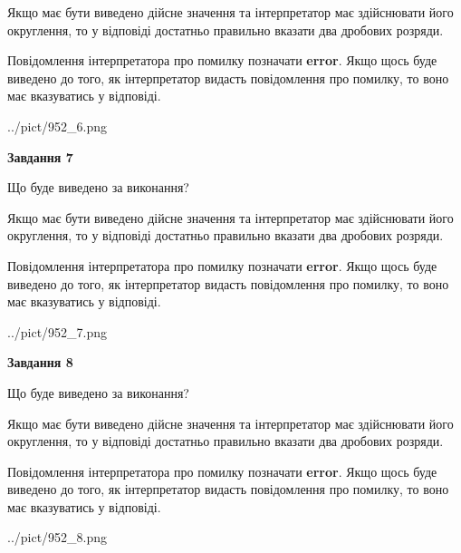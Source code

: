 \documentclass[12pt, ukrainian]{article}
\begin{document}
{\begin {Large}
Якщо має бути виведено дійсне значення та інтерпретатор має здійснювати його округлення, 
то у відповіді достатньо правильно вказати два дробових розряди.

Повідомлення інтерпретатора про помилку позначати \textbf{error}.
Якщо щось буде виведено до того, як інтерпретатор видасть повідомлення про помилку, 
то воно має вказуватись у відповіді. \par

\begin{center}
	{../pict/952_6.png}
\end{center}
\newpage

{\begin {center}\textbf{Завдання 7}\end {center}}\par
Що буде виведено за виконання? \par

Якщо має бути виведено дійсне значення та інтерпретатор має здійснювати його округлення, 
то у відповіді достатньо правильно вказати два дробових розряди.

Повідомлення інтерпретатора про помилку позначати \textbf{error}.
Якщо щось буде виведено до того, як інтерпретатор видасть повідомлення про помилку, 
то воно має вказуватись у відповіді. \par

\begin{center}
	{../pict/952_7.png}
\end{center}
\newpage

{\begin {center}\textbf{Завдання 8}\end {center}}\par
Що буде виведено за виконання? \par

Якщо має бути виведено дійсне значення та інтерпретатор має здійснювати його округлення, 
то у відповіді достатньо правильно вказати два дробових розряди.

Повідомлення інтерпретатора про помилку позначати \textbf{error}.
Якщо щось буде виведено до того, як інтерпретатор видасть повідомлення про помилку, 
то воно має вказуватись у відповіді. \par

\begin{center}
	{../pict/952_8.png}
\end{center}
\newpage


\end{Large}}
\end{document}
